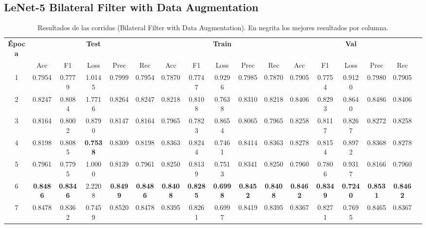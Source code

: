 \documentclass[conference]{IEEEtran}
\begin{document}
\subsection{LeNet-5 Bilateral Filter with Data Augmentation}
\begin{table}[h]
\scriptsize
\caption{Resultados de las corridas (Bilateral Filter with Data Augmentation). En negrita los mejores resultados por columna.}
\centering
\begin{tabular}{|c|c|c|c|c|c|c|c|c|c|c|c|c|c|c|c|c|}
\hline
\textbf{Época} & \multicolumn{5}{c|}{\textbf{Test}} & \multicolumn{5}{c|}{\textbf{Train}} & \multicolumn{5}{c|}{\textbf{Val}} \\
\cline{2-16}
 & Acc & F1 & Loss & Prec & Rec & Acc & F1 & Loss & Prec & Rec & Acc & F1 & Loss & Prec & Rec \\
\hline
1 & 0.7954 & 0.7779 & 1.0145 & 0.7999 & 0.7954 & 0.7870 & 0.7747 & 0.9296 & 0.7985 & 0.7870 & 0.7905 & 0.7754 & 0.9120 & 0.7980 & 0.7905 \\
2 & 0.8247 & 0.8084 & 1.7716 & 0.8264 & 0.8247 & 0.8218 & 0.8108 & 0.7638 & 0.8310 & 0.8218 & 0.8406 & 0.8293 & 0.8640 & 0.8486 & 0.8406 \\
3 & 0.8164 & 0.8002 & 0.8790 & 0.8147 & 0.8164 & 0.7965 & 0.7823 & 0.8654 & 0.8065 & 0.7965 & 0.8258 & 0.8117 & 0.8267 & 0.8272 & 0.8258 \\
4 & 0.8198 & 0.8085 & \textbf{0.7538} & 0.8309 & 0.8198 & 0.8363 & 0.8244 & 0.7461 & 0.8414 & 0.8363 & 0.8278 & 0.8154 & 0.8972 & 0.8368 & 0.8278 \\
5 & 0.7961 & 0.7795 & 1.0000 & 0.8139 & 0.7961 & 0.8250 & 0.8139 & 0.7513 & 0.8341 & 0.8250 & 0.7960 & 0.7806 & 0.9317 & 0.8166 & 0.7960 \\
6 & \textbf{0.8486} & \textbf{0.8346} & 2.2208 & \textbf{0.8499} & \textbf{0.8486} & \textbf{0.8408} & \textbf{0.8285} & \textbf{0.6998} & \textbf{0.8452} & \textbf{0.8408} & \textbf{0.8462} & \textbf{0.8349} & \textbf{0.7240} & \textbf{0.8531} & \textbf{0.8462} \\
7 & 0.8478 & 0.8362 & 0.7459 & 0.8520 & 0.8478 & 0.8395 & 0.8261 & 0.6997 & 0.8419 & 0.8395 & 0.8367 & 0.8271 & 0.7695 & 0.8465 & 0.8367 \\
\hline
\end{tabular}
\label{tab:bilateral_aug_results}
\end{table}
\end{document}
